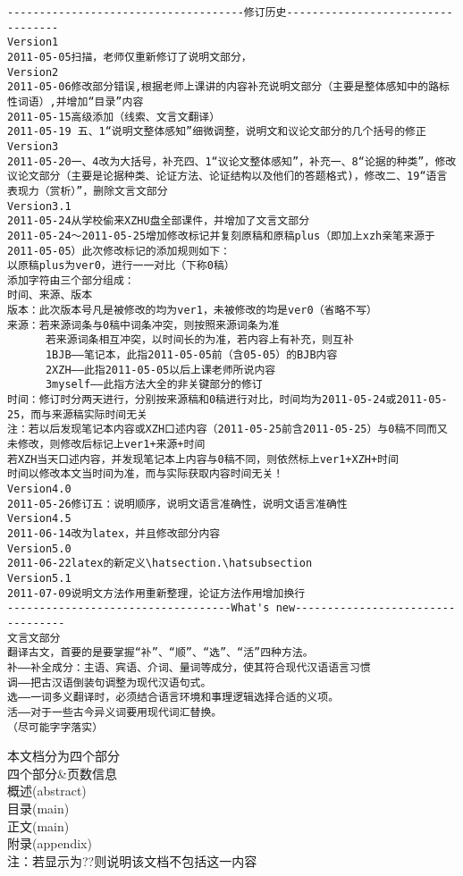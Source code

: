 \begin{verbatim}
-------------------------------------修订历史----------------------------------
Version1
2011-05-05扫描，老师仅重新修订了说明文部分，
Version2
2011-05-06修改部分错误,根据老师上课讲的内容补充说明文部分（主要是整体感知中的路标性词语）,并增加“目录”内容
2011-05-15高级添加（线索、文言文翻译）
2011-05-19 五、1“说明文整体感知”细微调整，说明文和议论文部分的几个括号的修正
Version3
2011-05-20一、4改为大括号，补充四、1“议论文整体感知”，补充一、8“论据的种类”，修改议论文部分（主要是论据种类、论证方法、论证结构以及他们的答题格式)，修改二、19“语言表现力（赏析）”，删除文言文部分
Version3.1
2011-05-24从学校偷来XZHU盘全部课件，并增加了文言文部分
2011-05-24～2011-05-25增加修改标记并复刻原稿和原稿plus（即加上xzh亲笔来源于2011-05-05）此次修改标记的添加规则如下：
以原稿plus为ver0，进行一一对比（下称0稿）
添加字符由三个部分组成：
时间、来源、版本
版本：此次版本号凡是被修改的均为ver1，未被修改的均是ver0（省略不写）
来源：若来源词条与0稿中词条冲突，则按照来源词条为准
      若来源词条相互冲突，以时间长的为准，若内容上有补充，则互补
      1BJB——笔记本，此指2011-05-05前（含05-05）的BJB内容
      2XZH——此指2011-05-05以后上课老师所说内容
      3myself——此指方法大全的非关键部分的修订
时间：修订时分两天进行，分别按来源稿和0稿进行对比，时间均为2011-05-24或2011-05-25，而与来源稿实际时间无关
注：若以后发现笔记本内容或XZH口述内容（2011-05-25前含2011-05-25）与0稿不同而又未修改，则修改后标记上ver1+来源+时间
若XZH当天口述内容，并发现笔记本上内容与0稿不同，则依然标上ver1+XZH+时间
时间以修改本文当时间为准，而与实际获取内容时间无关！
Version4.0
2011-05-26修订五：说明顺序，说明文语言准确性，说明文语言准确性
Version4.5
2011-06-14改为latex，并且修改部分内容
Version5.0
2011-06-22latex的新定义\hatsection.\hatsubsection
Version5.1
2011-07-09说明文方法作用重新整理，论证方法作用增加换行
-----------------------------------What's new----------------------------------
文言文部分
翻译古文，首要的是要掌握“补”、“顺”、“选”、“活”四种方法。
补——补全成分：主语、宾语、介词、量词等成分，使其符合现代汉语语言习惯
调——把古汉语倒装句调整为现代汉语句式。
选——一词多义翻译时，必须结合语言环境和事理逻辑选择合适的义项。
活——对于一些古今异义词要用现代词汇替换。
（尽可能字字落实）
\end{verbatim}
本文档分为四个部分\\
四个部分\&页数信息\\
概述(abstract)\pageref{abstract}\\
目录(main)\pageref{contents}\\
正文(main)\pageref{main}\\
附录(appendix)\pageref{appendix}\\
注：若显示为??则说明该文档不包括这一内容
\newpage
